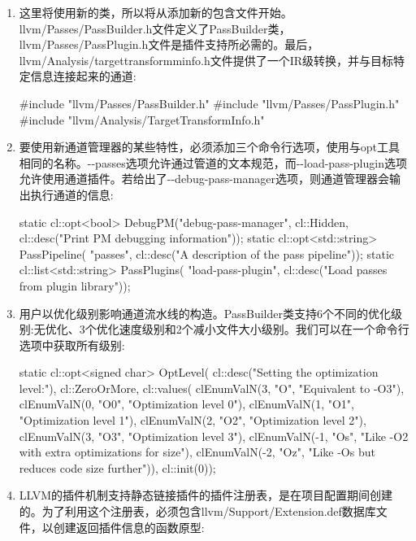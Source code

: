 \begin{enumerate}
\item
这里将使用新的类，所以将从添加新的包含文件开始。llvm/Passes/PassBuilder.h文件定义了PassBuilder类，llvm/Passes/PassPlugin.h文件是插件支持所必需的。最后，llvm/Analysis/targettransformminfo.h文件提供了一个IR级转换，并与目标特定信息连接起来的通道:

\begin{cpp}
#include "llvm/Passes/PassBuilder.h"
#include "llvm/Passes/PassPlugin.h"
#include "llvm/Analysis/TargetTransformInfo.h"
\end{cpp}

\item
要使用新通道管理器的某些特性，必须添加三个命令行选项，使用与opt工具相同的名称。-{}-passes选项允许通过管道的文本规范，而-{}-load-pass-plugin选项允许使用通道插件。若给出了-{}-debug-pass-manager选项，则通道管理器会输出执行通道的信息:

\begin{cpp}
static cl::opt<bool>
    DebugPM("debug-pass-manager", cl::Hidden,
        cl::desc("Print PM debugging information"));
static cl::opt<std::string> PassPipeline(
    "passes",
    cl::desc("A description of the pass pipeline"));
static cl::list<std::string> PassPlugins(
    "load-pass-plugin",
    cl::desc("Load passes from plugin library"));
\end{cpp}

\item
用户以优化级别影响通道流水线的构造。PassBuilder类支持6个不同的优化级别:无优化、3个优化速度级别和2个减小文件大小级别。我们可以在一个命令行选项中获取所有级别:

\begin{cpp}
static cl::opt<signed char> OptLevel(
    cl::desc("Setting the optimization level:"),
    cl::ZeroOrMore,
    cl::values(
        clEnumValN(3, "O", "Equivalent to -O3"),
        clEnumValN(0, "O0", "Optimization level 0"),
        clEnumValN(1, "O1", "Optimization level 1"),
        clEnumValN(2, "O2", "Optimization level 2"),
        clEnumValN(3, "O3", "Optimization level 3"),
        clEnumValN(-1, "Os", "Like -O2 with extra optimizations for size"),
        clEnumValN(-2, "Oz", "Like -Os but reduces code size further")),
        cl::init(0));
\end{cpp}

\item
LLVM的插件机制支持静态链接插件的插件注册表，是在项目配置期间创建的。为了利用这个注册表，必须包含llvm/Support/Extension.def数据库文件，以创建返回插件信息的函数原型:


\end{enumerate}
